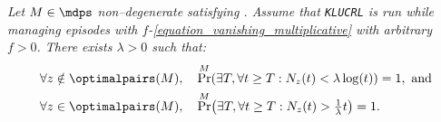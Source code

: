 \documentclass[preprint,cleveref,12pt]{colt2025}
\DeclarePairedDelimiter{\parens}{(}{)}	%
\def\models{\mdps}
\def\optpairs{\optimalpairs}
\begin{document}
    \par
    \bigskip
    \noindent
    \textbf{}
    \textit{
        Let $M \in \models$ non--degenerate satisfying .
        Assume that \texttt{KLUCRL} is run while managing episodes with $f$-\eqref{equation_vanishing_multiplicative} with arbitrary $f > 0$.
        There exists $\lambda > 0$ such that:
        \begin{align*}
            \forall z \notin \optpairs(M), \quad
            & \Pr^M \parens*{
                \exists T, \forall t \ge T :
                N_z(t) < \lambda \log(t)
            } = 1, 
            \text{~and}
            \\
            \forall z \in \optpairs(M), \quad
            & \Pr^M \parens*{
                \exists T, \forall t \ge T :
                N_z(t) > \tfrac 1\lambda t
            } = 1.
        \end{align*}
    }
\end{document}
